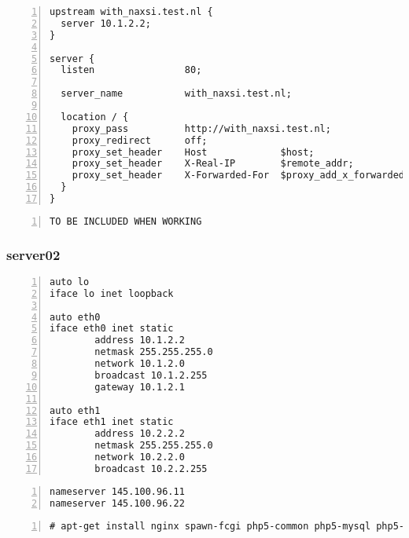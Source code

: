 \documentclass[Configuration]{subfiles}
\begin{document}
\begin{lstlisting}[frame=single,caption=/etc/nginx/sites-enabled/with\_naxsi.test.nl,backgroundcolor=\color{gray},breaklines=true,numbers=left,]
upstream with_naxsi.test.nl {
  server 10.1.2.2;
}

server {
  listen                80;

  server_name           with_naxsi.test.nl;

  location / {
    proxy_pass          http://with_naxsi.test.nl;
    proxy_redirect      off;
    proxy_set_header    Host             $host;
    proxy_set_header    X-Real-IP        $remote_addr;
    proxy_set_header    X-Forwarded-For  $proxy_add_x_forwarded_for;
  }
}
\end{lstlisting}

\begin{lstlisting}[frame=single,caption=/etc/nginx/nbs.rules,backgroundcolor=\color{gray},breaklines=true,numbers=left,]
TO BE INCLUDED WHEN WORKING
\end{lstlisting}

\subsubsection{server02}


\begin{lstlisting}[frame=single,caption=/etc/network/interfaces,backgroundcolor=\color{gray},breaklines=true,numbers=left,]
auto lo
iface lo inet loopback

auto eth0
iface eth0 inet static
        address 10.1.2.2
        netmask 255.255.255.0
        network 10.1.2.0
        broadcast 10.1.2.255
        gateway 10.1.2.1

auto eth1
iface eth1 inet static
        address 10.2.2.2
        netmask 255.255.255.0
        network 10.2.2.0
        broadcast 10.2.2.255
\end{lstlisting}

\begin{lstlisting}[frame=single,caption=/etc/resolv.conf,backgroundcolor=\color{gray},breaklines=true,numbers=left,]
nameserver 145.100.96.11
nameserver 145.100.96.22
\end{lstlisting}

\begin{lstlisting}[frame=single,caption=necessary packages,backgroundcolor=\color{gray},breaklines=true,numbers=left,]
# apt-get install nginx spawn-fcgi php5-common php5-mysql php5-xmlrpc php5-cgi php5-curl php5-gd php5-cli  php-apc php-pear php5-dev php5-imap php5-mcrypt
\end{lstlisting}
\end{document}
